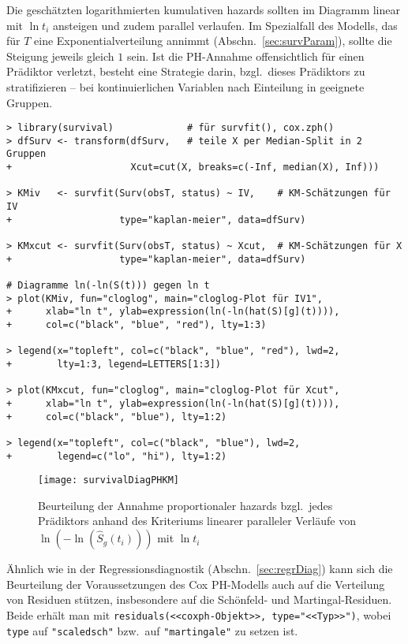 Die geschätzten logarithmierten kumulativen hazards sollten im Diagramm linear mit $\ln t_{i}$ ansteigen und zudem parallel verlaufen. Im Spezialfall des Modells, das für $T$ eine Exponentialverteilung annimmt (Abschn.\ \ref{sec:survParam}), sollte die Steigung jeweils gleich $1$ sein. Ist die PH-Annahme offensichtlich für einen Prädiktor verletzt, besteht eine Strategie darin, bzgl.\ dieses Prädiktors zu stratifizieren -- bei kontinuierlichen Variablen nach Einteilung in geeignete Gruppen.
\begin{lstlisting}
> library(survival)             # für survfit(), cox.zph()
> dfSurv <- transform(dfSurv,   # teile X per Median-Split in 2 Gruppen
+                     Xcut=cut(X, breaks=c(-Inf, median(X), Inf)))

> KMiv   <- survfit(Surv(obsT, status) ~ IV,    # KM-Schätzungen für IV
+                   type="kaplan-meier", data=dfSurv)

> KMxcut <- survfit(Surv(obsT, status) ~ Xcut,  # KM-Schätzungen für X
+                   type="kaplan-meier", data=dfSurv)

# Diagramme ln(-ln(S(t))) gegen ln t
> plot(KMiv, fun="cloglog", main="cloglog-Plot für IV1",
+      xlab="ln t", ylab=expression(ln(-ln(hat(S)[g](t)))),
+      col=c("black", "blue", "red"), lty=1:3)

> legend(x="topleft", col=c("black", "blue", "red"), lwd=2,
+        lty=1:3, legend=LETTERS[1:3])

> plot(KMxcut, fun="cloglog", main="cloglog-Plot für Xcut",
+      xlab="ln t", ylab=expression(ln(-ln(hat(S)[g](t)))),
+      col=c("black", "blue"), lty=1:2)

> legend(x="topleft", col=c("black", "blue"), lwd=2,
+        legend=c("lo", "hi"), lty=1:2)
\end{lstlisting}

\begin{figure}[ht]
\centering
\texttt{[image: survivalDiagPHKM]}
\vspace*{-1em}
\caption{Beurteilung der Annahme proportionaler hazards bzgl.\ jedes Prädiktors anhand des Kriteriums linearer paralleler Verläufe von $\ln(-\ln(\hat{S}_{g}(t_{i})))$ mit $\ln t_{i}$}
\label{fig:survivalDiagPHKM}
\end{figure}

Ähnlich wie in der Regressionsdiagnostik (Abschn.\ \ref{sec:regrDiag}) kann sich die Beurteilung der Voraussetzungen des Cox PH-Modells auch auf die Verteilung von Residuen stützen, insbesondere auf die Schönfeld- und Martingal-Residuen. Beide erhält man mit \lstinline!residuals(<<coxph-Objekt>>, type="<<Typ>>")!, wobei \lstinline!type! auf \lstinline!"scaledsch"! bzw.\ auf \lstinline!"martingale"! zu setzen ist.

